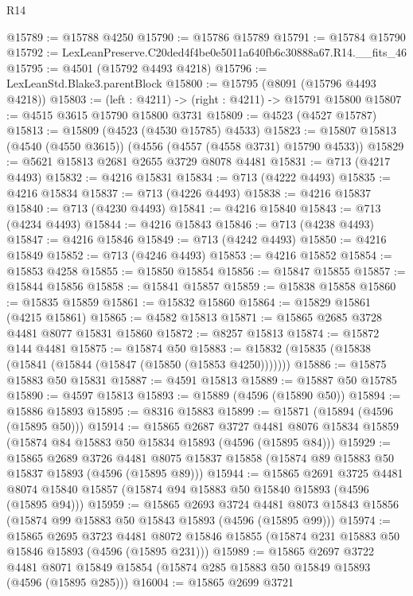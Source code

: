 \begin{lexlean}{R14}
\begin{coremodule}
@15789 := @15788 @4250
@15790 := @15786 @15789
@15791 := @15784 @15790
@15792 := LexLeanPreserve.C20ded4f4be0e5011a640fb6c30888a67.R14.__fits_46
@15795 := @4501 (@15792 @4493 @4218)
@15796 := LexLeanStd.Blake3.parentBlock
@15800 := @15795 (@8091 (@15796 @4493 @4218))
@15803 := (left : @4211) -> (right : @4211) -> @15791 @15800
@15807 := @4515 @3615 @15790 @15800 @3731
@15809 := @4523 (@4527 @15787)
@15813 := @15809 (@4523 (@4530 @15785) @4533)
@15823 := @15807 @15813 (@4540 (@4550 @3615)) (@4556 (@4557 (@4558 @3731) @15790 @4533))
@15829 := @5621 @15813 @2681 @2655 @3729 @8078 @4481
@15831 := @713 (@4217 @4493)
@15832 := @4216 @15831
@15834 := @713 (@4222 @4493)
@15835 := @4216 @15834
@15837 := @713 (@4226 @4493)
@15838 := @4216 @15837
@15840 := @713 (@4230 @4493)
@15841 := @4216 @15840
@15843 := @713 (@4234 @4493)
@15844 := @4216 @15843
@15846 := @713 (@4238 @4493)
@15847 := @4216 @15846
@15849 := @713 (@4242 @4493)
@15850 := @4216 @15849
@15852 := @713 (@4246 @4493)
@15853 := @4216 @15852
@15854 := @15853 @4258
@15855 := @15850 @15854
@15856 := @15847 @15855
@15857 := @15844 @15856
@15858 := @15841 @15857
@15859 := @15838 @15858
@15860 := @15835 @15859
@15861 := @15832 @15860
@15864 := @15829 @15861 (@4215 @15861)
@15865 := @4582 @15813
@15871 := @15865 @2685 @3728 @4481 @8077 @15831 @15860
@15872 := @8257 @15813
@15874 := @15872 @144 @4481
@15875 := @15874 @50
@15883 := @15832 (@15835 (@15838 (@15841 (@15844 (@15847 (@15850 (@15853 @4250)))))))
@15886 := @15875 @15883 @50 @15831
@15887 := @4591 @15813
@15889 := @15887 @50 @15785
@15890 := @4597 @15813
@15893 := @15889 (@4596 (@15890 @50))
@15894 := @15886 @15893
@15895 := @8316 @15883
@15899 := @15871 (@15894 (@4596 (@15895 @50)))
@15914 := @15865
    @2687
    @3727
    @4481
    @8076
    @15834
    @15859
    (@15874 @84 @15883 @50 @15834 @15893 (@4596 (@15895 @84)))
@15929 := @15865
    @2689
    @3726
    @4481
    @8075
    @15837
    @15858
    (@15874 @89 @15883 @50 @15837 @15893 (@4596 (@15895 @89)))
@15944 := @15865
    @2691
    @3725
    @4481
    @8074
    @15840
    @15857
    (@15874 @94 @15883 @50 @15840 @15893 (@4596 (@15895 @94)))
@15959 := @15865
    @2693
    @3724
    @4481
    @8073
    @15843
    @15856
    (@15874 @99 @15883 @50 @15843 @15893 (@4596 (@15895 @99)))
@15974 := @15865
    @2695
    @3723
    @4481
    @8072
    @15846
    @15855
    (@15874 @231 @15883 @50 @15846 @15893 (@4596 (@15895 @231)))
@15989 := @15865
    @2697
    @3722
    @4481
    @8071
    @15849
    @15854
    (@15874 @285 @15883 @50 @15849 @15893 (@4596 (@15895 @285)))
@16004 := @15865
    @2699
    @3721

\end{coremodule}
\end{lexlean}
